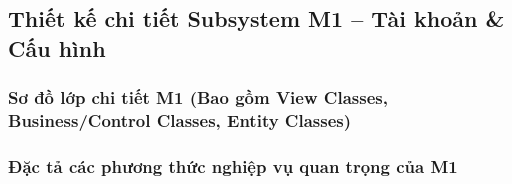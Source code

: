 \subsection{Thiết kế chi tiết Subsystem M1 – Tài khoản \& Cấu hình}

\subsubsection{Sơ đồ lớp chi tiết M1 (Bao gồm View Classes, Business/Control Classes, Entity Classes)}


\subsubsection{Đặc tả các phương thức nghiệp vụ quan trọng của M1}

